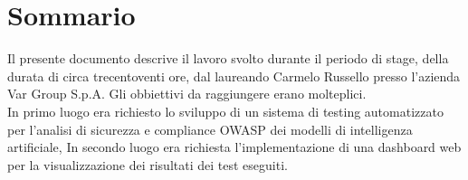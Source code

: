 \cleardoublepage
{}
{}
\begingroup
\let\clearpage\relax
\let\cleardoublepage\relax
\let\cleardoublepage\relax

\chapter*{Sommario}

Il presente documento descrive il lavoro svolto durante il periodo di stage, della durata di circa trecentoventi ore, dal laureando Carmelo Russello presso l'azienda Var Group S.p.A.
Gli obbiettivi da raggiungere erano molteplici.\\
In primo luogo era richiesto lo sviluppo di un sistema di testing automatizzato per l'analisi di sicurezza e compliance OWASP dei modelli di intelligenza artificiale,
In secondo luogo era richiesta l'implementazione di una dashboard web per la visualizzazione dei risultati dei test eseguiti.





\endgroup

\vfill
